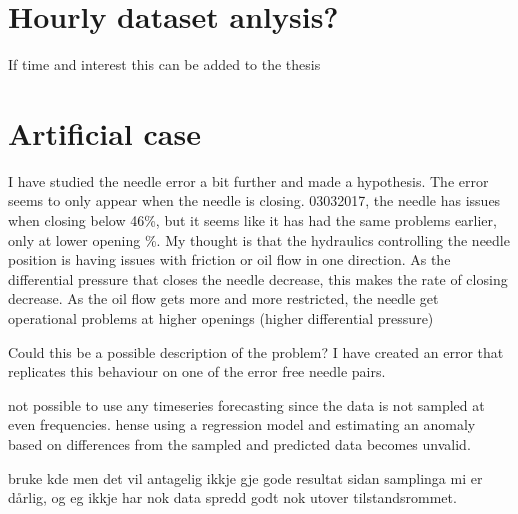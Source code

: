     \section{Hourly dataset anlysis?}
        If time and interest this can be added to the thesis 
    

    \section{Artificial case}
        I have studied the needle error a bit further and made a hypothesis. The error seems to only appear when the needle is closing. 03032017, the needle has issues when closing below 46\%, but it seems like it has had the same problems earlier, only at lower opening \%. My thought is that the hydraulics controlling the needle position is having issues with friction or oil flow in one direction. As the differential pressure that closes the needle decrease, this makes the rate of closing decrease. As the oil flow gets more and more restricted, the needle get operational problems at higher openings (higher differential pressure)
        
        Could this be a possible description of the problem? I have created an error that replicates this behaviour on one of the error free needle pairs. 

    
    not possible to use any timeseries forecasting since the data is not sampled at even frequencies. hense using a regression model and estimating an anomaly based on differences from the sampled and predicted data becomes unvalid. 
    
    bruke kde men det vil antagelig ikkje gje gode resultat sidan samplinga mi er dårlig, og eg ikkje har nok data spredd godt nok utover tilstandsrommet. 




    



